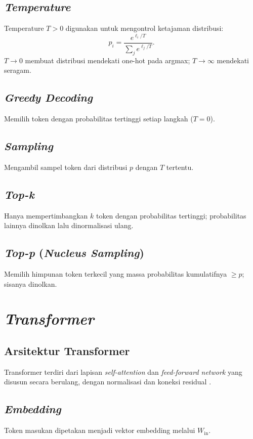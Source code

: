 \subsection{\textit{Temperature}}
Temperature \(T>0\) digunakan untuk mengontrol ketajaman distribusi:
\begin{equation}
p_i = \frac{e^{\ell_i / T}}{\sum_j e^{\ell_j / T}}.
\end{equation}
\(T \to 0\) membuat distribusi mendekati one-hot pada argmax; \(T \to \infty\) mendekati seragam.

\subsection{\textit{Greedy Decoding}}
Memilih token dengan probabilitas tertinggi setiap langkah (\(T=0\)).

\subsection{\textit{Sampling}}
Mengambil sampel token dari distribusi \(p\) dengan \(T\) tertentu.

\subsection{\textit{Top-k}}
Hanya mempertimbangkan \(k\) token dengan probabilitas tertinggi; probabilitas lainnya dinolkan lalu dinormalisasi ulang.

\subsection{\textit{Top-p} (\textit{Nucleus Sampling})}
Memilih himpunan token terkecil yang massa probabilitas kumulatifnya \(\ge p\); sisanya dinolkan.

\section{\textit{Transformer}}

\subsection{Arsitektur Transformer}
Transformer terdiri dari lapisan \textit{self-attention} dan \textit{feed-forward network} yang disusun secara berulang, dengan normalisasi dan koneksi residual \citep{vaswani}.

\subsection{\textit{Embedding}}
Token masukan dipetakan menjadi vektor embedding melalui \(W_{\mathrm{in}}\).


